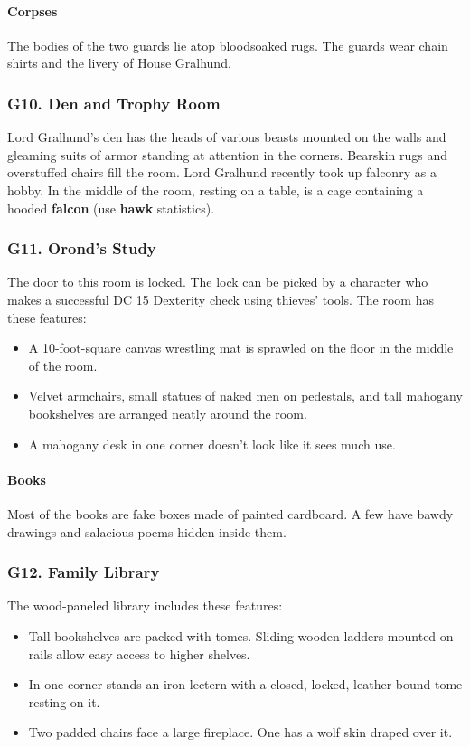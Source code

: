 \documentclass[10pt,a4paper,twoside,twocolumn,openany,nodeprecatedcode]{dndbook}
\begin{document}
\paragraph{Corpses}
The bodies of the two guards lie atop bloodsoaked rugs. The guards wear chain shirts and the livery of House Gralhund.
\subsubsection{G10. Den and Trophy Room}
Lord Gralhund's den has the heads of various beasts mounted on the walls and gleaming suits of armor standing at attention in the corners. Bearskin rugs and overstuffed chairs fill the room.
Lord Gralhund recently took up falconry as a hobby. In the middle of the room, resting on a table, is a cage containing a hooded \textbf{falcon} (use \textbf{hawk} statistics).
\subsubsection{G11. Orond's Study}
The door to this room is locked. The lock can be picked by a character who makes a successful DC 15 Dexterity check using thieves' tools. The room has these features:
\begin{itemize}

\item A 10-foot-square canvas wrestling mat is sprawled on the floor in the middle of the room.
\item Velvet armchairs, small statues of naked men on pedestals, and tall mahogany bookshelves are arranged neatly around the room.
\item A mahogany desk in one corner doesn't look like it sees much use.
\end{itemize}


\paragraph{Books}
Most of the books are fake boxes made of painted cardboard. A few have bawdy drawings and salacious poems hidden inside them.
\subsubsection{G12. Family Library}
The wood-paneled library includes these features:
\begin{itemize}

\item Tall bookshelves are packed with tomes. Sliding wooden ladders mounted on rails allow easy access to higher shelves.
\item In one corner stands an iron lectern with a closed, locked, leather-bound tome resting on it.
\item Two padded chairs face a large fireplace. One has a wolf skin draped over it.
\end{itemize}
\end{document}
